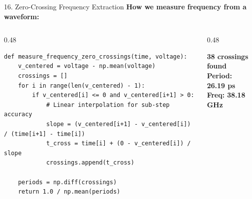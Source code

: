 \documentclass[aspectratio=169, 11pt]{beamer}
\begin{document}
\begin{frame}{16. Zero-Crossing Frequency Extraction}
    \textbf{How we measure frequency from a waveform:}

    \vspace{0.5em}
    \begin{columns}[T]
        \begin{column}{0.48\textwidth}
            \begin{lstlisting}
def measure_frequency_zero_crossings(time, voltage):
    v_centered = voltage - np.mean(voltage)
    crossings = []
    for i in range(len(v_centered) - 1):
        if v_centered[i] <= 0 and v_centered[i+1] > 0:
            # Linear interpolation for sub-step accuracy
            slope = (v_centered[i+1] - v_centered[i]) / (time[i+1] - time[i])
            t_cross = time[i] + (0 - v_centered[i]) / slope
            crossings.append(t_cross)

    periods = np.diff(crossings)
    return 1.0 / np.mean(periods)
            \end{lstlisting}
        \end{column}
        \begin{column}{0.48\textwidth}
            \begin{center}
            \end{center}
            \vspace{0.3em}
            \textbf{38 crossings found}\\
            \textbf{Period: 26.19 ps}\\
            \textbf{Freq: 38.18 GHz}
        \end{column}
    \end{columns}
\end{frame}
\end{document}
